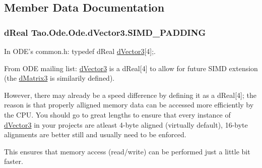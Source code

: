 \subsection{Member Data Documentation}
\hypertarget{struct_tao_1_1_ode_1_1_ode_1_1d_vector3_a55bee0bf3fa4d5d18117dc6043db7758}{
\subsubsection[{SIMD\_\-PADDING}]{\setlength{\rightskip}{0pt plus 5cm}dReal {\bf Tao.Ode.Ode.dVector3.SIMD\_\-PADDING}}}
\label{struct_tao_1_1_ode_1_1_ode_1_1d_vector3_a55bee0bf3fa4d5d18117dc6043db7758}


In ODE's common.h: typedef dReal \hyperlink{struct_tao_1_1_ode_1_1_ode_1_1d_vector3}{dVector3}\mbox{[}4\mbox{]};. 

From ODE mailing list: \hyperlink{struct_tao_1_1_ode_1_1_ode_1_1d_vector3}{dVector3} is a dReal\mbox{[}4\mbox{]} to allow for future SIMD extension (the \hyperlink{struct_tao_1_1_ode_1_1_ode_1_1d_matrix3}{dMatrix3} is similarily defined).

However, there may already be a speed difference by defining it as a dReal\mbox{[}4\mbox{]}; the reason is that properly alligned memory data can be accessed more efficiently by the CPU. You should go to great lengths to ensure that every instance of \hyperlink{struct_tao_1_1_ode_1_1_ode_1_1d_vector3}{dVector3} in your projects are atleast 4-\/byte aligned (virtually default), 16-\/byte alignments are better still and usually need to be enforced.

This ensures that memory access (read/write) can be performed just a little bit faster.

